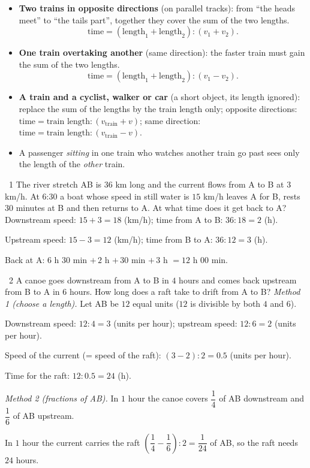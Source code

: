 \gap
{}
\begin{knowbox}\begin{itemize}[leftmargin=1.4em,itemsep=3pt]
\item \textbf{Two trains in opposite directions} (on parallel tracks): from ``the heads meet'' to ``the tails part'', together they cover the sum of the two lengths.
\[\text{time}=(\text{length}_1+\text{length}_2):(v_1+v_2).\]
\item \textbf{One train overtaking another} (same direction): the faster train must gain the sum of the two lengths.
\[\text{time}=(\text{length}_1+\text{length}_2):(v_1-v_2).\]
\item \textbf{A train and a cyclist, walker or car} (a short object, its length ignored): replace the sum of the lengths by the train length only;
opposite directions: $\text{time}=\text{train length}:(v_{\text{train}}+v)$; same direction: $\text{time}=\text{train length}:(v_{\text{train}}-v)$.
\item A passenger \emph{sitting} in one train who watches another train go past sees only the length of the \emph{other} train.
\end{itemize}\end{knowbox}
\gap
\begin{exbox}{\ExWord\ 1}
The river stretch AB is $36$ km long and the current flows from A to B at $3$ km/h. At $6$:$30$ a boat whose speed in still water is $15$ km/h leaves A for B, rests $30$ minutes at B and then returns to A. At what time does it get back to A?
\guide
Downstream speed: $15+3=18$ (km/h); time from A to B: $36:18=2$ (h).\par
Upstream speed: $15-3=12$ (km/h); time from B to A: $36:12=3$ (h).\par
Back at A: $6$ h $30$ min $+\,2$ h $+\,30$ min $+\,3$ h $=12$ h $00$ min.
\end{exbox}
\gap
\begin{exbox}{\ExWord\ 2}
A canoe goes downstream from A to B in $4$ hours and comes back upstream from B to A in $6$ hours. How long does a raft take to drift from A to B?
\guide
\textit{Method 1 (choose a length).} Let AB be $12$ equal units ($12$ is divisible by both $4$ and $6$).\par
Downstream speed: $12:4=3$ (units per hour); upstream speed: $12:6=2$ (units per hour).\par
Speed of the current (= speed of the raft): $(3-2):2=0.5$ (units per hour).\par
Time for the raft: $12:0.5=24$ (h).\par\smallskip
\textit{Method 2 (fractions of AB).} In $1$ hour the canoe covers $\dfrac14$ of AB downstream and $\dfrac16$ of AB upstream.\par
In $1$ hour the current carries the raft $\left(\dfrac14-\dfrac16\right):2=\dfrac1{24}$ of AB, so the raft needs $24$ hours.
\end{exbox}
